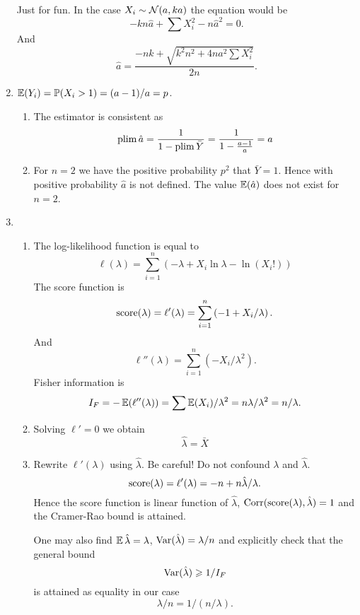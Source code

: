 \begin{enumerate}
Just for fun. 
In the case $X_i \sim \mathcal{N}(a, ka)$ the equation would be
\[
-kn\hat a + \sum X_i^2 - n\hat a^2 = 0.    
\]
And 
\[
\hat a = \frac{-nk + \sqrt{k^2 n^2  + 4na^2 \sum X_i^2}}{2n}.    
\]



\item $\operatorname{\mathbb{E}}(Y_i) = \operatorname{\mathbb{P}}(X_i > 1) = (a-1) / a = p$.
\begin{enumerate}
    \item The estimator is consistent as
\[
\operatorname*{plim} \hat a = \frac {1}{1- \operatorname*{plim} \bar Y } = \frac{1}{1 - \frac{a-1}{a}} = a
\]
\item 
For $n=2$ we have the positive probability $p^2$ that $\bar Y = 1$.
Hence with positive probability $\hat a$ is not defined.
The value $\operatorname{\mathbb{E}}(\hat a)$ does not exist for $n=2$.
\end{enumerate}

\item 
\begin{enumerate}
\item The log-likelihood function is equal to
\[
\ell(\lambda) = \sum_{i=1}^n \left( -\lambda + X_i \ln \lambda - \ln (X_i!)\right)    
\]
The score function is 
\[
\mathrm{score}(\lambda) = \ell'(\lambda) = \sum_{i=1}^n \left( -1 + X_i / \lambda\right).
\]
And
\[
\ell''(\lambda) = \sum_{i=1}^n \left(- X_i / \lambda^2 \right).
\]
Fisher information is 
\[
I_F = -\operatorname{\mathbb{E}}(\ell''(\lambda)) = \sum \operatorname{\mathbb{E}}(X_i) / \lambda^2 = n\lambda / \lambda^2 = n/\lambda.    
\]

\item Solving $\ell' = 0$ we obtain 
\[
\hat \lambda = \bar X    
\] 

\item Rewrite $\ell'(\lambda)$ using $\hat\lambda$. 
Be careful! Do not confound $\lambda$ and $\hat\lambda$. 
\[
\mathrm{score}(\lambda) = \ell'(\lambda) = -n + n \hat \lambda / \lambda.
\]
Hence the score function is linear function of $\hat\lambda$, $\operatorname{Corr}(\mathrm{score}(\lambda), \hat\lambda) = 1$
and the Cramer-Rao bound is attained. 

One may also  find $\operatorname{\mathbb{E}} \hat \lambda = \lambda$, $\operatorname{Var}(\hat \lambda) = \lambda / n$ and
explicitly check that the general bound
\[
\operatorname{Var}(\hat \lambda) \geqslant 1/ I_F 
\]
is attained as equality in our case
\[
    \lambda / n = 1/(n/\lambda). 
\]


\end{enumerate}


\end{enumerate}
